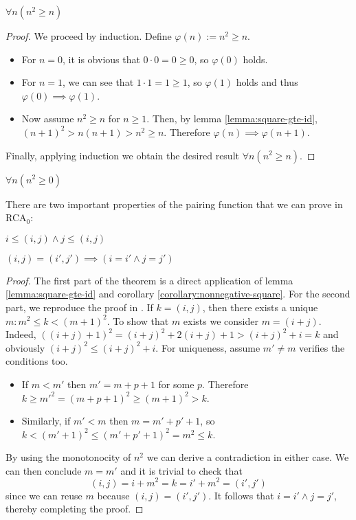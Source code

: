\documentclass[../main.tex]{memoir}
\begin{document}
\begin{lemma}
  \label{lemma:square-gte-id}
  $\forall n (n^2 \ge n)$
\end{lemma}
\begin{proof}
  We proceed by induction. Define $\varphi(n) := n^2 \ge n$.
  \begin{itemize}
  \item For $n = 0$, it is obvious that $0 \cdot 0 = 0 \ge 0$, so $\varphi(0)$ holds.
  \item For $n = 1$, we can see that $1 \cdot 1 = 1 \ge 1$, so $\varphi(1)$ holds and thus $\varphi(0) \implies \varphi(1)$.
  \item Now assume $n^2 \ge n$ for $n \ge 1$. Then, by lemma \ref{lemma:square-gte-id}, $(n + 1)^2 > n(n + 1) > n^2 \ge n$. Therefore $\varphi(n) \implies \varphi(n + 1)$.
  \end{itemize}

  Finally, applying \re  induction we obtain the desired result $\forall n (n^2 \ge n)$.
\end{proof}

\begin{corollary}
  \label{corollary:nonnegative-square}
  $\forall n (n^2 \ge 0)$
\end{corollary}

There are two important properties of the pairing function that we can prove in RCA$_0$:

\begin{theorem}
  \label{thm:pairing-properties}
\item $i \le (i, j) \land j \le (i, j)$
\item $(i, j) = (i', j') \implies (i = i' \land j = j')$
\end{theorem}
\begin{proof}
  The first part of the theorem is a direct application of lemma \ref{lemma:square-gte-id} and corollary \ref{corollary:nonnegative-square}. For the second part, we reproduce the proof in \cite{simpson}.
  If $k = (i, j)$, then there exists a unique $m: m^2 \le k < (m + 1)^2$. To show that $m$ exists we consider $m = (i + j)$. Indeed, $((i + j) + 1)^2 = (i + j)^2 + 2(i + j) + 1 > (i + j)^2 + i = k$ and obviously $(i + j)^2 \le (i + j)^2 + i$. For uniqueness, assume $m' \neq m$ verifies the conditions too.

  \begin{itemize}
  \item If $m < m'$ then $m' = m + p + 1$ for some $p$. Therefore $k \ge m'^2 = (m + p + 1)^2 \ge (m + 1)^2 > k$.
  \item Similarly, if $m' < m$ then $m = m' + p' + 1$, so $k < (m' + 1)^2 \le (m' + p' + 1)^2 = m^2 \le k$.
  \end{itemize}

  By using the monotonocity of $n^2$ we can derive a contradiction in either case. We can then conclude $m = m'$ and it is trivial to check that
  \[
    (i, j) = i + m^2 = k = i' + m^2 = (i', j')
  \]
  since we can reuse $m$ because $(i, j) = (i', j')$. It follows that $i = i' \land j = j'$, thereby completing the proof.
\end{proof}
\end{document}
